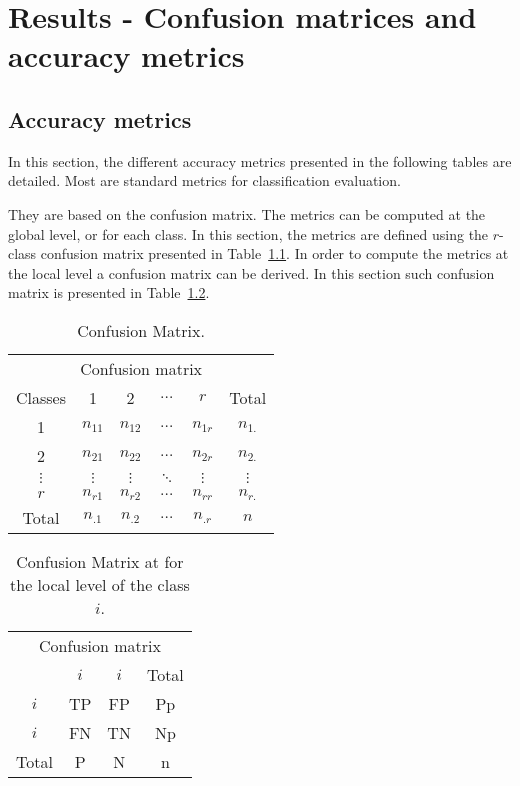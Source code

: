 
\chapter{Results - Confusion matrices and accuracy metrics} %

\label{AppendixC} %

\startcontents[chapters]
\Mprintcontents
\section{Accuracy metrics}
In this section, the different accuracy metrics presented in the following tables are detailed. Most are standard metrics for classification evaluation. 

They are based on the confusion matrix. The metrics can be computed at the global level, or for each class. In this section, the metrics are defined using the $r$-class confusion matrix presented in Table~\ref{table:confusion_ref1}. In order to compute the metrics at the local level a confusion matrix can be derived. In this section such confusion matrix is presented in Table~\ref{table:confusion_ref2}.

\begin{table}[H]
\begin{center}
\begin{tabular}{c|c c c c| c}

\multicolumn{6}{c}{Confusion matrix} \\

 Classes & 1 & 2 & $\hdots$ & $r$ & Total \\
\hline
1 & $n_{11}$ & $n_{12}$ & $\hdots$ & $n_{1r}$ & $n_{1.}$ \\
2  & $n_{21}$ & $n_{22}$ & $\hdots$ & $n_{2r}$ & $n_{2.}$ \\
$\vdots$  & $\vdots$ & $\vdots$ & $\ddots$ & $\vdots$ & $\vdots$\\
$r$ & $n_{r1}$ & $n_{r2}$ & $\hdots$ & $n_{rr}$ & $n_{r.}$\\
\hline
Total & $n_{.1}$ & $n_{.2}$ & $\hdots$ & $n_{.r}$ & $n$\\
\end{tabular}
\caption{Confusion Matrix.}
\label{table:confusion_ref1}
\end{center}
\end{table}

\begin{table}[H]
\begin{center}
\begin{tabular}{c|c c| c}

\multicolumn{4}{c}{Confusion matrix} \\
 & $i$ & \st{$i$} & Total \\
\hline
$i$ & TP & FP & Pp \\
\st{$i$} & FN & TN & Np \\
\hline
Total & P & N & n
\end{tabular}
\caption{Confusion Matrix at for the local level of the class $i$.}
\label{table:confusion_ref2}
\end{center}
\end{table}

